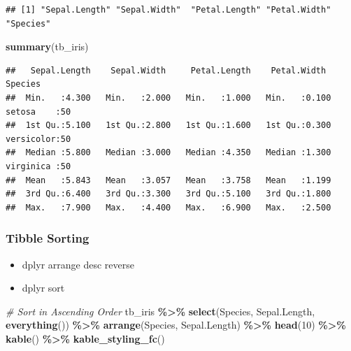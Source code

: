 \documentclass[
]{book}
\newenvironment{Shaded}{\begin{snugshade}}{\end{snugshade}}
\newcommand{\CommentTok}[1]{\textcolor[rgb]{0.56,0.35,0.01}{\textit{#1}}}
\newcommand{\DecValTok}[1]{\textcolor[rgb]{0.00,0.00,0.81}{#1}}
\newcommand{\KeywordTok}[1]{\textcolor[rgb]{0.13,0.29,0.53}{\textbf{#1}}}
\newcommand{\NormalTok}[1]{#1}
\newcommand{\OperatorTok}[1]{\textcolor[rgb]{0.81,0.36,0.00}{\textbf{#1}}}
\newcommand{\StringTok}[1]{\textcolor[rgb]{0.31,0.60,0.02}{#1}}
\providecommand{\tightlist}{%
  \setlength{\itemsep}{0pt}\setlength{\parskip}{0pt}}
\begin{document}
\begin{verbatim}
## [1] "Sepal.Length" "Sepal.Width"  "Petal.Length" "Petal.Width"  "Species"
\end{verbatim}

\begin{Shaded}
\begin{Highlighting}[]
\KeywordTok{summary}\NormalTok{(tb\_iris)}
\end{Highlighting}
\end{Shaded}

\begin{verbatim}
##   Sepal.Length    Sepal.Width     Petal.Length    Petal.Width          Species  
##  Min.   :4.300   Min.   :2.000   Min.   :1.000   Min.   :0.100   setosa    :50  
##  1st Qu.:5.100   1st Qu.:2.800   1st Qu.:1.600   1st Qu.:0.300   versicolor:50  
##  Median :5.800   Median :3.000   Median :4.350   Median :1.300   virginica :50  
##  Mean   :5.843   Mean   :3.057   Mean   :3.758   Mean   :1.199                  
##  3rd Qu.:6.400   3rd Qu.:3.300   3rd Qu.:5.100   3rd Qu.:1.800                  
##  Max.   :7.900   Max.   :4.400   Max.   :6.900   Max.   :2.500
\end{verbatim}

\hypertarget{tibble-sorting}{%
\subsubsection{Tibble Sorting}\label{tibble-sorting}}

\begin{itemize}
\tightlist
\item
  dplyr arrange desc reverse
\item
  dplyr sort
\end{itemize}

\begin{Shaded}
\begin{Highlighting}[]
\CommentTok{\# Sort in Ascending Order}
\NormalTok{tb\_iris }\OperatorTok{\%\textgreater{}\%}\StringTok{ }\KeywordTok{select}\NormalTok{(Species, Sepal.Length, }\KeywordTok{everything}\NormalTok{()) }\OperatorTok{\%\textgreater{}\%}
\StringTok{  }\KeywordTok{arrange}\NormalTok{(Species, Sepal.Length) }\OperatorTok{\%\textgreater{}\%}\StringTok{ }\KeywordTok{head}\NormalTok{(}\DecValTok{10}\NormalTok{) }\OperatorTok{\%\textgreater{}\%}
\StringTok{  }\KeywordTok{kable}\NormalTok{() }\OperatorTok{\%\textgreater{}\%}\StringTok{ }\KeywordTok{kable\_styling\_fc}\NormalTok{()}
\end{Highlighting}
\end{Shaded}
\end{document}
